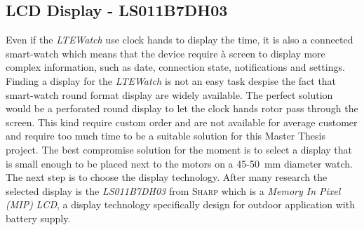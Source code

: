 \documentclass[report.tex]{subfiles}
\begin{document}
\pagebreak
\subsection{LCD Display - LS011B7DH03} \label{sec:disp_sel}
Even if the \textit{LTEWatch} use clock hands to display the time, it is also a connected smart-watch which means that the device require à screen to display more complex information, such as date, connection state, notifications and settings.\\

Finding a display for the \textit{LTEWatch} is not an easy task despise the fact that smart-watch round format display are widely available. The perfect solution would be a perforated round display to let the clock hands rotor pass through the screen. This kind require custom order and are not available for average customer and require too much time to be a suitable solution for this Master Thesis project. The best compromise solution for the moment is to select a display that is small enough to be placed next to the motors on a 45-\SI{50}{\milli\meter} diameter watch.\\

The next step is to choose the display technology. After many research the selected display is the \textit{LS011B7DH03}\cite{LS011B7DH03} from \textsc{Sharp} which is a \textit{Memory In Pixel (MIP)} \textit{LCD}, a display technology specifically design for outdoor application with battery supply. 
\end{document}
